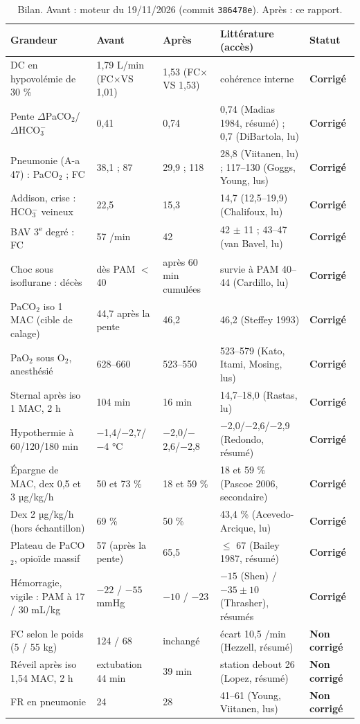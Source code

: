 \documentclass[10pt,a4paper]{article}
\newcommand{\corr}{\textcolor{blue!60!black}{\textbf{Corrigé}}}
\newcommand{\nc}{\textcolor{orange!80!black}{\textbf{Non corrigé}}}
\begin{document}
\begin{table}[h]\small
\caption{Bilan. Avant : moteur du 19/11/2026 (commit \texttt{386478e}). Après : ce rapport.}\label{tab:bilan}
\begin{tabularx}{\linewidth}{P{3.6cm}P{3.0cm}P{3.0cm}LP{1.5cm}}
\toprule
Grandeur & Avant & Après & Littérature (accès) & Statut\\
\midrule
DC en hypovolémie de 30 \% & 1,79 L/min (FC$\times$VS 1,01) & 1,53 (FC$\times$VS 1,53) & cohérence interne & \corr\\
Pente $\Delta$PaCO$_2$/$\Delta$HCO$_3^-$ & 0,41 & 0,74 & 0,74 (Madias 1984, résumé) ; 0,7 (DiBartola, lu) & \corr\\
Pneumonie (A-a 47) : PaCO$_2$ ; FC & 38,1 ; 87 & 29,9 ; 118 & 28,8 (Viitanen, lu) ; 117–130 (Goggs, Young, lus) & \corr\\
Addison, crise : HCO$_3^-$ veineux & 22,5 & 15,3 & 14,7 (12,5–19,9) (Chalifoux, lu) & \corr\\
BAV 3\textsuperscript{e} degré : FC & 57 /min & 42 & 42 $\pm$ 11 ; 43–47 (van Bavel, lu) & \corr\\
Choc sous isoflurane : décès & dès PAM $<$ 40 & après 60 min cumulées & survie à PAM 40–44 (Cardillo, lu) & \corr\\
PaCO$_2$ iso 1 MAC (cible de calage) & 44,7 après la pente & 46,2 & 46,2 (Steffey 1993) & \corr\\
PaO$_2$ sous O$_2$, anesthésié & 628–660 & 523–550 & 523–579 (Kato, Itami, Mosing, lus) & \corr\\
Sternal après iso 1 MAC, 2 h & 104 min & 16 min & 14,7–18,0 (Rastas, lu) & \corr\\
Hypothermie à 60/120/180 min & $-$1,4/$-$2,7/$-$4 °C & $-$2,0/$-$2,6/$-$2,8 & $-$2,0/$-$2,6/$-$2,9 (Redondo, résumé) & \corr\\
Épargne de MAC, dex 0,5 et 3 µg/kg/h & 50 et 73 \% & 18 et 59 \% & 18 et 59 \% (Pascoe 2006, secondaire) & \corr\\
Dex 2 µg/kg/h (hors échantillon) & 69 \% & 50 \% & 43,4 \% (Acevedo-Arcique, lu) & \corr\\
Plateau de PaCO$_2$, opioïde massif & 57 (après la pente) & 65,5 & $\le$ 67 (Bailey 1987, résumé) & \corr\\
Hémorragie, vigile : PAM à 17 / 30 mL/kg & $-22$ / $-55$ mmHg & $-10$ / $-23$ & $-15$ (Shen) / $-35 \pm 10$ (Thrasher), résumés & \corr\\
FC selon le poids (5 / 55 kg) & 124 / 68 & inchangé & écart 10,5 /min (Hezzell, résumé) & \nc\\
Réveil après iso 1,54 MAC, 2 h & extubation 44 min & 39 min & station debout 26 (Lopez, résumé) & \nc\\
FR en pneumonie & 24 & 28 & 41–61 (Young, Viitanen, lus) & \nc\\
\bottomrule
\end{tabularx}
\end{table}
\end{document}
